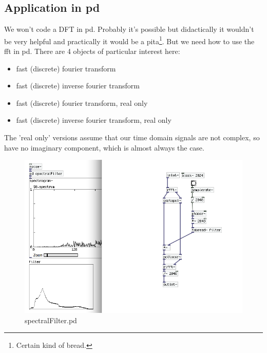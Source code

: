 \subsection{Application in pd}
We won't code a DFT in pd. Probably it's possible but didactically it wouldn't be very helpful and practically it would be a pita\footnote{Certain kind of bread.}. But we need how to use the fft in pd. There are 4 objects of particular interest here:
\begin{itemize}
	\item {} fast (discrete) fourier transform
	\item {} fast (discrete) inverse fourier transform
	\item {} fast (discrete) fourier transform, real only
	\item {} fast (discrete) inverse fourier transform, real only
\end{itemize}
The 'real only' versions assume that our time domain signals are not complex, so have no imaginary component, which is almost always the case.

\begin{figure}[h]
	\begin{center}
		\includegraphics[width = 14cm]{img/spectralFilter.png}
		\caption{spectralFilter.pd}
		\label{fig:spectralFilter}
	\end{center}
\end{figure}

